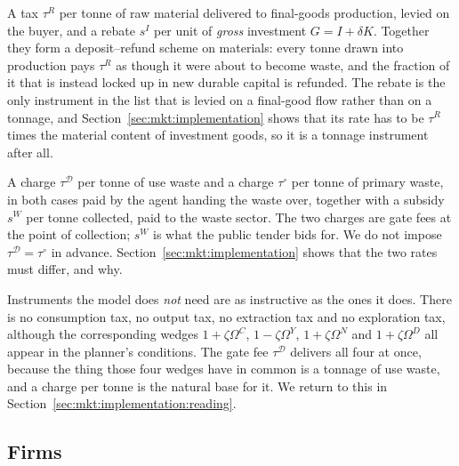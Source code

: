  A tax $\tau^R$ per tonne of raw material delivered to final-goods
production, levied on the buyer, and a rebate $s^I$ per unit of \emph{gross} investment $G=I+\delta K$.
Together they form a deposit--refund scheme on materials: every tonne drawn into production pays
$\tau^R$ as though it were about to become waste, and the fraction of it that is instead locked up in
new durable capital is refunded. The rebate is the only instrument in the list that is levied on a
final-good flow rather than on a tonnage, and Section~\ref{sec:mkt:implementation} shows that its rate
has to be $\tau^R$ times the material content of investment goods, so it is a tonnage instrument after
all.

 A charge $\tau^{\mathcal D}$ per tonne of use waste and a
charge $\tau^{\circ}$ per tonne of primary waste, in both cases paid by the agent handing the waste
over, together with a subsidy $s^W$ per tonne collected, paid to the waste sector. The two charges are
gate fees at the point of collection; $s^W$ is what the public tender bids for. We do not impose
$\tau^{\mathcal D}=\tau^{\circ}$ in advance. Section~\ref{sec:mkt:implementation} shows that the two
rates must differ, and why.

Instruments the model does \emph{not} need are as instructive as the ones it does. There is no
consumption tax, no output tax, no extraction tax and no exploration tax, although the corresponding
wedges $1+\zeta\Omega^C$, $1-\zeta\Omega^Y$, $1+\zeta\Omega^N$ and $1+\zeta\Omega^D$ all appear in the
planner's conditions. The gate fee $\tau^{\mathcal D}$ delivers all four at once, because the thing
those four wedges have in common is a tonnage of use waste, and a charge per tonne is the natural base
for it. We return to this in Section~\ref{sec:mkt:implementation:reading}.

\subsection{Firms}\label{sec:mkt:setup:firms}

